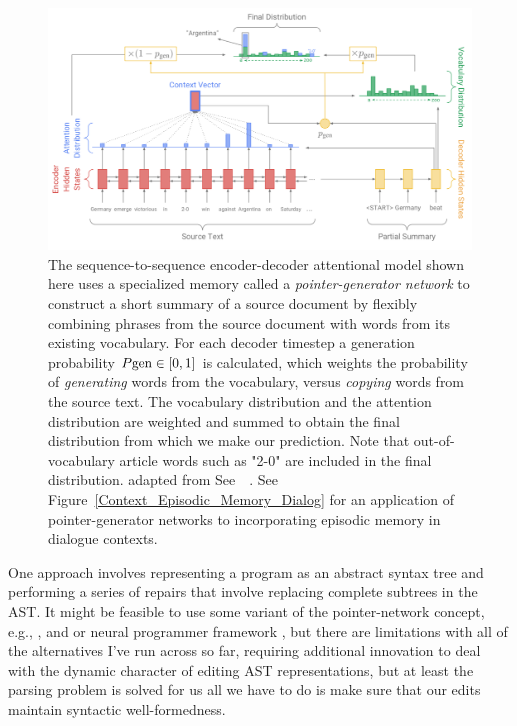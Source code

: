
\begin{figure}
%
  \begin{center}
    \includegraphics[width=5.0in]{./figures/SeeetalACL-17_Figure_03.png}
  \end{center}
%
  \caption{The sequence-to-sequence encoder-decoder attentional model shown here uses a specialized memory called a {\it{pointer-generator network}} to construct a short summary of a source document by flexibly combining phrases from the source document with words from its existing vocabulary. For each decoder timestep a generation probability $P\mbox{\rm{gen}} \in{} [0, 1]$ is calculated, which weights the probability of {\it{generating}} words from the vocabulary, versus {\it{copying}} words from the source text. The vocabulary distribution and the attention distribution are weighted and summed to obtain the final distribution from which we make our prediction. Note that out-of-vocabulary article words such as "2-0" are included in the final distribution. \emdash{} adapted from See~\etal{}~\cite{SeeetalACL-17}. See Figure~\ref{Context_Episodic_Memory_Dialog} for an application of pointer-generator networks to incorporating episodic memory in dialogue contexts.}
%
  \label{fig_SeeetalACL-17_Figure_03}
%
\end{figure}


One approach involves representing a program as an abstract syntax tree and performing a series of repairs that involve replacing complete subtrees in the AST. It might be feasible to use some variant of the pointer-network concept, e.g., {\cite{BhoopchandetalICLR-17}}, {\cite{SeeetalACL-17}} and  {\cite{WangandJiangICLR-17}} or neural programmer framework {\cite{NeelakantanetalICLR-17}}, but there are limitations with all of the alternatives I've run across so far, requiring additional innovation to deal with the dynamic character of editing AST representations, but at least the parsing problem is solved for us \emdash{} all we have to do is make sure that our edits maintain syntactic well-formedness.

